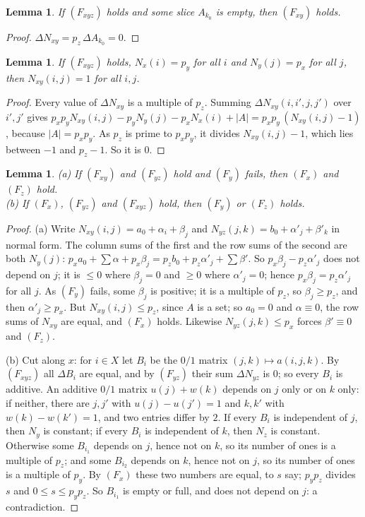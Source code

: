 \documentclass[11pt,a4paper]{amsart}
\newtheorem{lemma}[theorem]{Lemma}
\theoremstyle{definition}
\theoremstyle{remark}
\begin{document}
\begin{lemma}\label{lem:four}
If $(F_{xyz})$ holds and some slice $A_{k_0}$ is empty, then $(F_{xy})$ holds.
\end{lemma}
\begin{proof}
$\Delta N_{xy}=p_z\,\Delta A_{k_0}=0$.
\end{proof}

\begin{lemma}\label{lem:five}
If $(F_{xyz})$ holds, $N_x(i)=p_y$ for all $i$ and $N_y(j)=p_x$ for all $j$, then $N_{xy}(i,j)=1$ for all $i,j$.
\end{lemma}
\begin{proof}
Every value of $\Delta N_{xy}$ is a multiple of $p_z$. Summing $\Delta N_{xy}(i,i',j,j')$ over $i',j'$ gives
$p_xp_yN_{xy}(i,j)-p_yN_y(j)-p_xN_x(i)+|A|=p_xp_y\,(N_{xy}(i,j)-1)$, because $|A|=p_xp_y$. As $p_z$ is prime to
$p_xp_y$, it divides $N_{xy}(i,j)-1$, which lies between $-1$ and $p_z-1$. So it is $0$.
\end{proof}

\begin{lemma}\label{lem:six}
\textup{(a)} If $(F_{xy})$ and $(F_{yz})$ hold and $(F_y)$ fails, then $(F_x)$ and $(F_z)$ hold.\\
\textup{(b)} If $(F_x)$, $(F_{yz})$ and $(F_{xyz})$ hold, then $(F_y)$ or $(F_z)$ holds.
\end{lemma}
\begin{proof}
(a) Write $N_{xy}(i,j)=a_0+\alpha_i+\beta_j$ and $N_{yz}(j,k)=b_0+\alpha'_j+\beta'_k$ in normal form. The column
sums of the first and the row sums of the second are both $N_y(j)$:
$p_xa_0+\sum\alpha+p_x\beta_j=p_zb_0+p_z\alpha'_j+\sum\beta'$. So $p_x\beta_j-p_z\alpha'_j$ does not depend on $j$;
it is $\le 0$ where $\beta_j=0$ and $\ge 0$ where $\alpha'_j=0$; hence $p_x\beta_j=p_z\alpha'_j$ for all $j$. As
$(F_y)$ fails, some $\beta_j$ is positive; it is a multiple of $p_z$, so $\beta_j\ge p_z$, and then
$\alpha'_j\ge p_x$. But $N_{xy}(i,j)\le p_z$, since $A$ is a set; so $a_0=0$ and $\alpha\equiv0$, the row sums of
$N_{xy}$ are equal, and $(F_x)$ holds. Likewise $N_{yz}(j,k)\le p_x$ forces $\beta'\equiv 0$ and $(F_z)$.

(b) Cut along $x$: for $i\in X$ let $B_i$ be the $0/1$ matrix $(j,k)\mapsto a(i,j,k)$. By $(F_{xyz})$ all
$\Delta B_i$ are equal, and by $(F_{yz})$ their sum $\Delta N_{yz}$ is $0$; so every $B_i$ is additive. An
additive $0/1$ matrix $u(j)+w(k)$ depends on $j$ only or on $k$ only: if neither, there are $j,j'$ with
$u(j)-u(j')=1$ and $k,k'$ with $w(k)-w(k')=1$, and two entries differ by $2$. If every $B_i$ is independent of
$j$, then $N_y$ is constant; if every $B_i$ is independent of $k$, then $N_z$ is constant. Otherwise some $B_{i_1}$
depends on $j$, hence not on $k$, so its number of ones is a multiple of $p_z$; and some $B_{i_2}$ depends on $k$,
hence not on $j$, so its number of ones is a multiple of $p_y$. By $(F_x)$ these two numbers are equal, to $s$
say; $p_yp_z$ divides $s$ and $0\le s\le p_yp_z$. So $B_{i_1}$ is empty or full, and does not depend on $j$: a
contradiction.
\end{proof}
\end{document}
